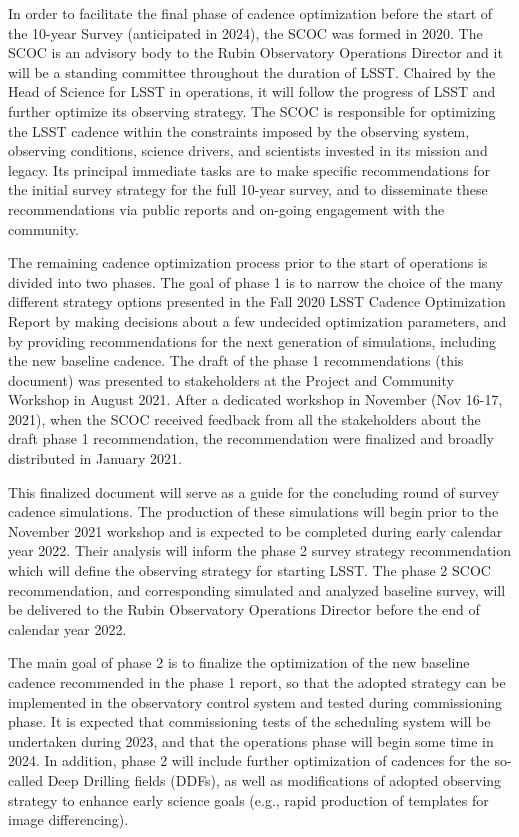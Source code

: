 In order to facilitate the final phase of cadence optimization before the start of the 10-year Survey (anticipated in 2024), the SCOC was formed in 2020. The SCOC is an advisory body to the Rubin Observatory Operations Director and it will be a standing committee throughout the duration of LSST. Chaired by the Head of Science for LSST in operations, it will follow the progress of LSST and further optimize its observing strategy. The SCOC is responsible for optimizing the LSST cadence within the constraints imposed by the observing system, observing conditions, science drivers, and scientists invested in its mission and legacy. Its principal immediate tasks are to make specific recommendations for the initial survey strategy for the full 10-year survey, and to disseminate these recommendations via public reports and on-going engagement with the community. 

The remaining cadence optimization process prior to the start of operations is divided into two phases. The goal of phase 1 is to narrow the choice of the many different strategy options presented in the Fall 2020 LSST Cadence Optimization Report by making decisions about a few undecided optimization parameters, and by providing recommendations for the next generation of simulations, including the new baseline cadence. The draft of the phase 1 recommendations (this document) was presented to stakeholders at the Project and Community Workshop in August 2021. After a dedicated workshop in November (Nov 16-17, 2021), when the SCOC received feedback from all the stakeholders about the draft phase 1 recommendation, the recommendation were finalized and broadly distributed in January 2021.

This finalized document will serve as a guide for the concluding round of survey cadence simulations. The production of these simulations will begin prior to the November 2021 workshop and is expected to be completed during early calendar year 2022. Their analysis will inform the phase 2 survey strategy recommendation which will define the observing strategy for starting LSST. The phase 2 SCOC recommendation, and corresponding simulated and analyzed baseline survey, will be delivered to the Rubin Observatory Operations Director before the end of calendar year 2022. 

The main goal of phase 2 is to finalize the optimization of the new baseline cadence recommended in the phase 1 report, so that the adopted strategy can be implemented in the observatory  control system and tested during commissioning phase. It is expected that commissioning tests of the scheduling system will be undertaken during 2023, and that the operations phase will begin some time in 2024. In addition, phase 2 will include further optimization of cadences for the so-called Deep Drilling fields (DDFs), as well as modifications of adopted observing strategy to enhance early science goals (e.g., rapid production of templates for image differencing). 


